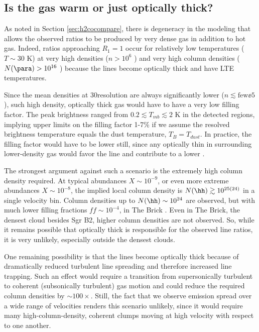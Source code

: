 \subsection{Is the gas warm or just optically thick?}
\label{sec:thickorwarm}
As noted in Section \ref{sec:h2cocompare}, there is degeneracy in the modeling
that allows the observed ratios to be produced by very dense gas in addition to
hot gas.  Indeed, ratios approaching $R_1=1$ occur for relatively low
temperatures ($T\sim30$ K) at very high densities ($n>10^{6}$ \percc)
and very high column densities ($N(\para)>10^{16}$ \perkms \persc) because
the lines become optically thick and have LTE temperatures.

Since the mean densities at 30\arcsec resolution are always significantly lower
($n\lesssim\mathrm{few}\ee{5}$ \percc), such high density,
optically thick gas would have to have a very low filling factor.  The peak
\para \threeohthree brightness ranged from $0.2 \lesssim T_{mb} \lesssim 2$ K
in the detected regions, implying upper limits on the filling factor 1-7\% if
we assume the resolved brightness temperature equals the dust temperature,
$T_B=T_{dust}$.
In practice, the filling factor would have to be lower still, since any
optically thin \para in surrounding lower-density gas would favor the
\threeohthree line and contribute to a lower \Rone.

The strongest argument against such a scenario is the extremely high column
density required.  At typical \para abundances $X\sim10^{-9}$, or even more
extreme abundances $X\sim10^{-8}$, the implied local column density is
$N(\hh)\gtrsim10^{25(24)}$ in a single velocity bin.  Column densities up to
$N(\hh)\sim10^{24}$ \persc are observed, but with much lower filling fractions
$ff\sim10^{-4}$, in The Brick \citep[][their Figure 4]{Rathborne2014a}.  Even
in The Brick, the densest cloud besides Sgr B2, higher column densities are not
observed.  So, while it remains possible that optically thick \para is
responsible for the observed line ratios, it is very unlikely, especially
outside the densest clouds.

One remaining possibility is that the \para lines become optically thick
because of dramatically reduced turbulent line spreading and therefore
increased line trapping.  Such an effect would require a transition from
supersonically turbulent to coherent (subsonically turbulent) gas motion
\citep[e.g.][]{Pineda2010a} and could reduce the required column densities by
$\sim100\times$.  Still, the fact that we observe \para emission spread over a
wide range of velocities renders this scenario unlikely, since it would require
many high-column-density, coherent clumps moving at high velocity with respect
to one another.


